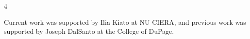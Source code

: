 \documentclass{article}
\newcommand{\smallfont}{\fontsize{18}{24}\selectfont}
\begin{document}
\begin{multicols}{4}
\begin{tcolorbox}[sectionbox=Discussion]
\end{tcolorbox}

\begin{tcolorbox}[sectionbox=Acknowledgments]

Current work was supported by Ilia Kiato at NU CIERA,
and previous work was supported by Joseph DalSanto at the College of DuPage.

\end{tcolorbox}

\begin{tcolorbox}[sectionbox=References]
\printbibliography[heading=none]
\end{tcolorbox}

\end{multicols}
\end{document}
